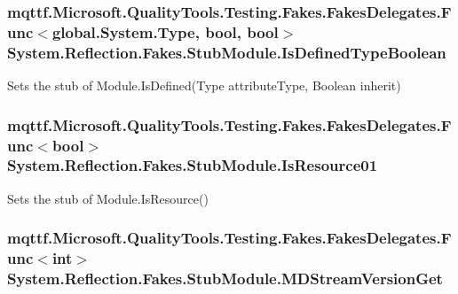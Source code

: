 \hypertarget{class_system_1_1_reflection_1_1_fakes_1_1_stub_module_a1b62da188199653b3ddbded756f280df}{
\subsubsection[{Is\-Defined\-Type\-Boolean}]{\setlength{\rightskip}{0pt plus 5cm}mqttf.\-Microsoft.\-Quality\-Tools.\-Testing.\-Fakes.\-Fakes\-Delegates.\-Func$<$global.\-System.\-Type, bool, bool$>$ System.\-Reflection.\-Fakes.\-Stub\-Module.\-Is\-Defined\-Type\-Boolean}}\label{class_system_1_1_reflection_1_1_fakes_1_1_stub_module_a1b62da188199653b3ddbded756f280df}


Sets the stub of Module.\-Is\-Defined(\-Type attribute\-Type, Boolean inherit)

\hypertarget{class_system_1_1_reflection_1_1_fakes_1_1_stub_module_a6334f711df96b389cd70023b438b4654}{
\subsubsection[{Is\-Resource01}]{\setlength{\rightskip}{0pt plus 5cm}mqttf.\-Microsoft.\-Quality\-Tools.\-Testing.\-Fakes.\-Fakes\-Delegates.\-Func$<$bool$>$ System.\-Reflection.\-Fakes.\-Stub\-Module.\-Is\-Resource01}}\label{class_system_1_1_reflection_1_1_fakes_1_1_stub_module_a6334f711df96b389cd70023b438b4654}


Sets the stub of Module.\-Is\-Resource()

\hypertarget{class_system_1_1_reflection_1_1_fakes_1_1_stub_module_ae04f373ebce1c4637f398cfb04b3b754}{
\subsubsection[{M\-D\-Stream\-Version\-Get}]{\setlength{\rightskip}{0pt plus 5cm}mqttf.\-Microsoft.\-Quality\-Tools.\-Testing.\-Fakes.\-Fakes\-Delegates.\-Func$<$int$>$ System.\-Reflection.\-Fakes.\-Stub\-Module.\-M\-D\-Stream\-Version\-Get}}\label{class_system_1_1_reflection_1_1_fakes_1_1_stub_module_ae04f373ebce1c4637f398cfb04b3b754}


